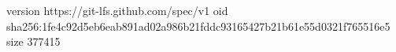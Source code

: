 version https://git-lfs.github.com/spec/v1
oid sha256:1fe4c92d5eb6eab891ad02a986b21fddc93165427b21b61e55d0321f765516e5
size 377415
